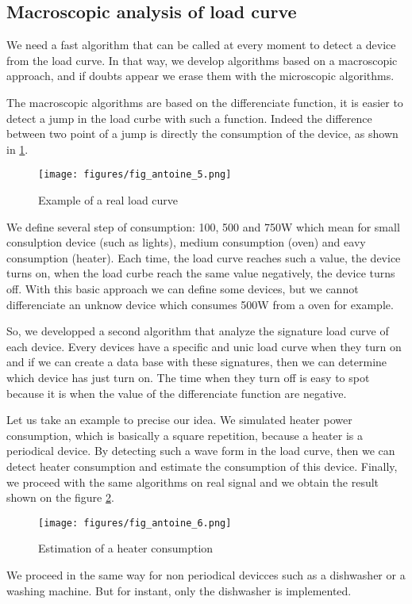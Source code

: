 \subsection{Macroscopic analysis of load curve}

We need a fast algorithm that can be called at every moment to detect a device from the load curve. In that way, we develop algorithms based on a macroscopic approach, and if doubts appear we erase them with the microscopic algorithms.

The macroscopic algorithms are based on the differenciate function, it is easier to detect a jump in the load curbe with such a function. Indeed the difference between two point of a jump is directly the consumption of the device, as shown in \ref{fig1}.

\begin{figure}[H]
\centering
\texttt{[image: figures/fig\_antoine\_5.png]}
\caption{Example of a real load curve}
\label{fig1}
\end{figure}

We define several step of consumption: 100, 500 and 750W which mean for small consulption device (such as lights), medium consumption (oven) and eavy consumption (heater). Each time, the load curve reaches such a value, the device turns on, when the load curbe reach the same value negatively, the device turns off. With this basic approach we can define some devices, but we cannot differenciate an unknow device which consumes 500W from a oven for example.

So, we developped a second algorithm that analyze the signature load curve of each device. Every devices have a specific and unic load curve when they turn on and if we can create a data base with these signatures, then we can determine which device has just turn on. The time when they turn off is easy to spot because it is when the value of the differenciate function are negative.

Let us take an example to precise our idea. We simulated heater power consumption, which is basically a square repetition, because a heater is a periodical device. By detecting such a wave form in the load curve, then we can detect heater consumption and estimate the consumption of this device. Finally, we proceed with the same algorithms on real signal and we obtain the result shown on the figure \ref{fig2}.


\begin{figure}[H]
\centering
\texttt{[image: figures/fig\_antoine\_6.png]}
\caption{Estimation of a heater consumption}
\label{fig2}
\end{figure}


We proceed in the same way for non periodical devicces such as a dishwasher or a washing machine. But for instant, only the dishwasher is implemented.


